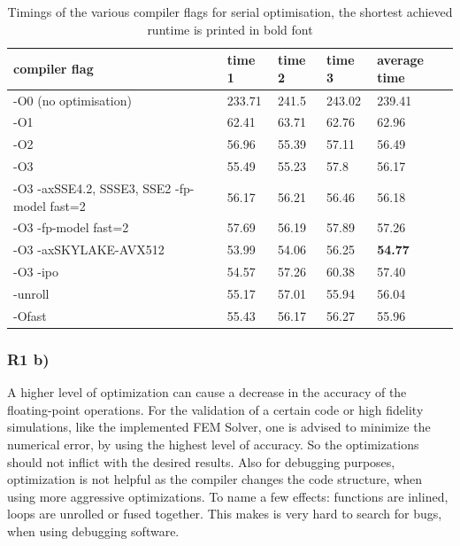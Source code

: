 \documentclass[a4paper, 11pt, oneside]{scrartcl}
\begin{document}
\renewcommand{\arraystretch}{2}
\begin{table}[h!]
	\begin{center}
		\begin{tabular}{| p{5cm} | p{1.5cm} p{1.5cm} p{1.5cm} | p{1.5cm} | }
			\hline
			\hline
			compiler flag & time 1 & time 2 & time 3 & average time\\
			\hline
			-O0 (no optimisation) & 233.71	& 241.5	& 243.02 & 239.41 \\
			\hline
			-O1 & 62.41	& 63.71	& 62.76	& 62.96\\
			\hline
			-O2 & 56.96	& 55.39	& 57.11	& 56.49\\
			\hline 
			-O3 & 55.49	& 55.23	& 57.8	& 56.17\\
			\hline
			-O3 -axSSE4.2, SSSE3, SSE2 -fp-model fast=2 & 56.17	& 56.21	& 56.46	& 56.18\\
			\hline
			-O3 -fp-model fast=2 & 57.69 & 56.19 & 57.89 & 57.26\\
			\hline
			-O3 -axSKYLAKE-AVX512 & 53.99 & 54.06 & 56.25 & \textbf{54.77}\\
			\hline
			-O3 -ipo & 54.57 & 57.26 & 60.38 & 57.40\\
			\hline
			-unroll & 55.17	& 57.01	& 55.94	& 56.04\\
			\hline
			-Ofast & 55.43	& 56.17	& 56.27	& 55.96\\
			\hline
			\hline
		\end{tabular}
		\caption{\label{tab:SerialTimings}  Timings of the various compiler flags for serial optimisation, the shortest achieved runtime is printed in bold font}
	\end{center}
\end{table}
\renewcommand{\arraystretch}{1}

\subsubsection*{R1 b)}
A higher level of optimization can cause a decrease in the accuracy of the floating-point operations. For the validation of a certain code or high fidelity simulations, like the implemented FEM Solver, one is advised to minimize the numerical error, by using the highest level of accuracy. So the optimizations should not inflict with the desired results. Also for debugging purposes, optimization is not helpful as the compiler changes the code structure, when using more aggressive optimizations. To name a few effects: functions are inlined, loops are unrolled or fused together. This makes is very hard to search for bugs, when using debugging software.
\end{document}
